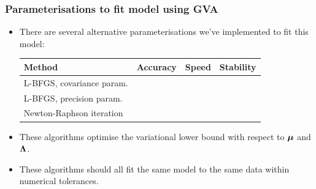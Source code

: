 \documentclass{beamer}
\begin{document}
	\begin{frame}
		\frametitle{Parameterisations to fit model using GVA}
		\begin{itemize}
			\item There are several \mbox{alternative} parameterisations we've implemented
			      to fit this model:
			      \begin{tabular}{|l|ccc|}
			      	\hline
			      	Method                                   & Accuracy   & Speed      & Stability  \\
			      	\hline
			      	L-BFGS, covariance param.        & \checkmark &            & \checkmark \\
			      	L-BFGS, precision param. & \checkmark & \checkmark & \checkmark \\
			      	Newton-Raphson iteration                 & \checkmark & \checkmark &            \\
			      	\hline
			      \end{tabular}	
			\item These algorithms optimise the variational lower bound with respect to
			      ${\boldsymbol \mu}$ and ${\boldsymbol \Lambda}$.
			\item These algorithms should all fit the same model to the same data
			      within numerical tolerances.
		\end{itemize}
	\end{frame}
		
\end{document}
